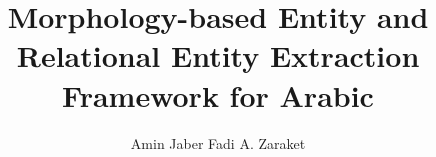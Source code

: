 \documentclass[english,utf8x]{article-hermes}
\title[\framework]{Morphology-based Entity and Relational Entity Extraction Framework for Arabic}
\author{Amin Jaber \andauthor Fadi A. Zaraket}
\begin{document}
\maketitlepage
\end{document}
